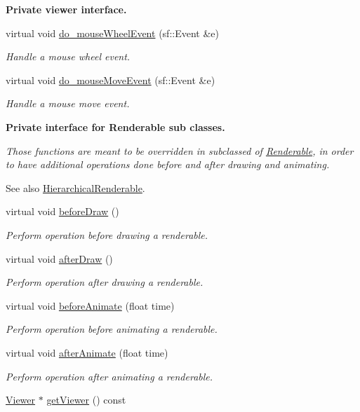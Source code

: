 \begin{Indent}{\bf Private viewer interface.}
\begin{DoxyCompactItemize}
virtual void \hyperlink{classRenderable_ab0d2c0b1171e5c593918fc39cd7fec19}{do\+\_\+mouse\+Wheel\+Event} (sf\+::\+Event \&e)
\begin{DoxyCompactList}\small\item\em Handle a mouse wheel event. \end{DoxyCompactList}\item 
virtual void \hyperlink{classRenderable_a4e7d850da9dd8ad9ef5693dadd4001d2}{do\+\_\+mouse\+Move\+Event} (sf\+::\+Event \&e)
\begin{DoxyCompactList}\small\item\em Handle a mouse move event. \end{DoxyCompactList}\end{DoxyCompactItemize}
\end{Indent}
\begin{Indent}{\bf Private interface for Renderable sub classes.}\par
{\em Those functions are meant to be overridden in subclassed of \hyperlink{classRenderable}{Renderable}, in order to have additional operations done before and after drawing and animating. \begin{DoxySeeAlso}{See also}
\hyperlink{classHierarchicalRenderable}{Hierarchical\+Renderable}. 
\end{DoxySeeAlso}
}\begin{DoxyCompactItemize}
\item 
virtual void \hyperlink{classRenderable_ad2fd96564194f598555b4f141e8c48be}{before\+Draw} ()
\begin{DoxyCompactList}\small\item\em Perform operation before drawing a renderable. \end{DoxyCompactList}\item 
virtual void \hyperlink{classRenderable_a9c715cafdda260b94bf6fe12853a3bb7}{after\+Draw} ()
\begin{DoxyCompactList}\small\item\em Perform operation after drawing a renderable. \end{DoxyCompactList}\item 
virtual void \hyperlink{classRenderable_a8eea615c4abdd96d6747afab8e0c7a95}{before\+Animate} (float time)
\begin{DoxyCompactList}\small\item\em Perform operation before animating a renderable. \end{DoxyCompactList}\item 
virtual void \hyperlink{classRenderable_a027e4c23636f492df33461a23320a336}{after\+Animate} (float time)
\begin{DoxyCompactList}\small\item\em Perform operation after animating a renderable. \end{DoxyCompactList}\item 
\hyperlink{classViewer}{Viewer} $\ast$ \hyperlink{classRenderable_aa7e8cdb8786681b77ee454b5ebe00483}{get\+Viewer} () const 
\end{DoxyCompactItemize}
\end{Indent}



